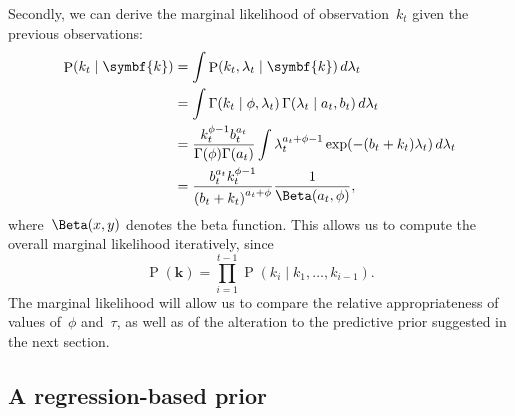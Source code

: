 \documentclass[12pt,a4paper]{article}
\newcommand\ub[1]{\symbf{#1}}                 %
\DeclareMathOperator\Pb{P}                    %
\DeclarePairedDelimiter\lr{\lparen}{\rparen}  %
\begin{document}
Secondly, we can derive the marginal likelihood of observation~$k_t$ given the
previous observations:
\begin{align*}
  \Pb(k_t \mid \ub{k}) &= \int \Pb(k_t, \lambda_t \mid \ub{k})\, d\lambda_t \\
  &= \int \Gamma(k_t \mid \phi, \lambda_t)\,
    \Gamma\lr*{\lambda_t \mid a_t, b_t}\, d\lambda_t \\
  &= \frac{k_t^{\phi-1}b_t^{a_t}}
    {\Gamma(\phi)\Gamma(a_t)} \int \lambda_t^{a_t+\phi-1}
    \exp\lr*{-\lr*{b_t + k_t}\lambda_t}\, d\lambda_t \\
  &= \frac{b_t^{a_t} k_t^{\phi-1}}{\lr*{b_t + k_t}^{a_t+\phi}}
    \frac{1}{\Beta(a_t, \phi)},
\end{align*}
where~$\Beta(x, y)$ denotes the beta function. This allows us to compute the
overall marginal likelihood iteratively, since
\begin{equation*}
  \Pb(\ub{k}) = \prod_{i=1}^{t-1} \Pb(k_i \mid k_1, \dots, k_{i-1}).
\end{equation*}
The marginal likelihood will allow us to compare the relative appropriateness
of values of~$\phi$ and~$\tau$, as well as of the alteration to the predictive
prior suggested in the next section.

\subsection*{A regression-based prior} %




\printbibliography
\end{document}
